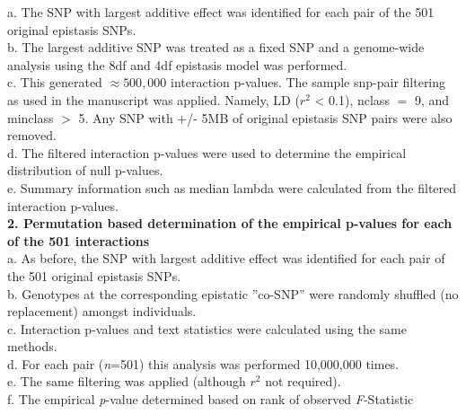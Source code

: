 \documentclass[paper=a4, fontsize=11pt]{scrartcl}         %
\numberwithin{equation}{section}                  %
\numberwithin{figure}{section}                    %
\numberwithin{table}{section}                   %
\begin{document}
a. The SNP with largest additive effect was identified for each pair of the 501 original epistasis SNPs. \\

b. The largest additive SNP was treated as a fixed SNP and a genome-wide analysis using the 8df and 4df epistasis model was performed. \\

c. This generated $\approx 500,000$ interaction p-values. The sample snp-pair filtering as used in the manuscript was applied. Namely, LD ($r^2$ < 0.1), nclass $=$ 9, and minclass $>$ 5. Any SNP with +/- 5MB of original epistasis SNP pairs were also removed. \\

d.  The filtered interaction p-values were used to determine the empirical distribution of null p-values. \\

e. Summary information such as median lambda were calculated from the filtered interaction p-values. \\

\textbf{2. Permutation based determination of the empirical p-values for each of the 501 interactions} \\

a. As before, the SNP with largest additive effect was identified for each pair of the 501 original epistasis SNPs. \\

b. Genotypes at the corresponding epistatic ''co-SNP'' were randomly shuffled (no replacement) amongst individuals. \\

c. Interaction p-values and text statistics were calculated using the same methods. \\

d. For each pair (\emph{n}=501) this analysis was performed 10,000,000 times. \\

e. The same filtering was applied (although $r^2$ not required). \\

f. The empirical \emph{p}-value determined based on rank of observed \emph{F}-Statistic 

\newpage
\end{document}
